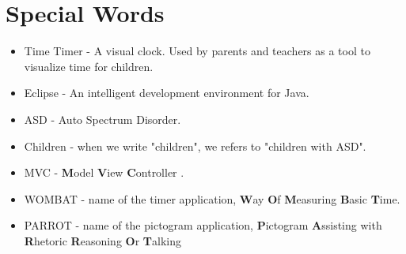 \chapter*{Special Words}

\begin{itemize}

	\item Time Timer - A visual clock. Used by parents and teachers as a tool to visualize time for children.
	\item Eclipse - An intelligent development environment for Java.
	\item ASD - Auto Spectrum Disorder.
	\item Children - when we write "children", we refers to "children with ASD".
	\item MVC - \textbf{M}odel \textbf{V}iew \textbf{C}ontroller \cite{MVC}.
	\item WOMBAT - name of the timer application, \textbf{W}ay \textbf{O}f \textbf{M}easuring \textbf{B}asic \textbf{T}ime.
	\item PARROT - name of the pictogram application, \textbf{P}ictogram \textbf{A}ssisting with \textbf{R}hetoric \textbf{R}easoning \textbf{O}r \textbf{T}alking

\end{itemize}